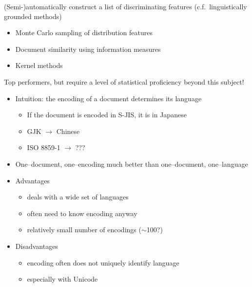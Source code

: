 \documentclass[a4paper,landscape,headrule,footrule,xetex]{foils}
\begin{document}

(Semi-)automatically construct a list of discriminating features (c.f.\
linguistically grounded methods)
\begin{itemize}
\item Monte Carlo sampling of distribution features %
\item Document similarity using information measures %
\item Kernel methods %
\end{itemize}
Top performers, but require a level of statistical proficiency beyond this
subject!




\begin{itemize}
\item Intuition: the encoding of a document determines its language
\begin{itemize}
\item If the document is encoded in S-JIS, it is in Japanese
\item GJK $\rightarrow$ Chinese
\item ISO 8859-1 $\rightarrow$ ???
\end{itemize}
\item One--document, one--encoding much better than one--document, one--language
\item Advantages
  \begin{itemize}
  \item deals with a wide set of languages
  \item often need to know encoding anyway
  \item relatively small number of encodings ($\sim$100?)
  \end{itemize}
\item Disadvantages
  \begin{itemize}
  \item encoding often does not uniquely identify language
  \item especially with Unicode
  \end{itemize}
\end{itemize}





\end{document}
